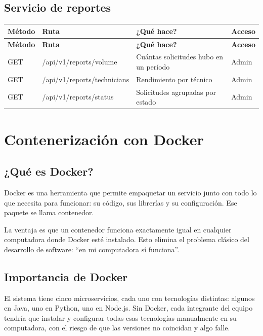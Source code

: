 \documentclass[12pt, a4paper]{report}
\begin{document}
\section{Servicio de reportes}

\begin{longtable}{|p{1.8cm}|p{5.2cm}|p{3.8cm}|p{1.8cm}|}
\hline
\textbf{Método} & \textbf{Ruta} & \textbf{¿Qué hace?} &
\textbf{Acceso} \\
\hline
\endfirsthead
\hline
\textbf{Método} & \textbf{Ruta} & \textbf{¿Qué hace?} &
\textbf{Acceso} \\
\hline
\endhead
GET & /api/v1/reports/volume &
Cuántas solicitudes hubo en un período & Admin \\
\hline
GET & /api/v1/reports/technicians &
Rendimiento por técnico & Admin \\
\hline
GET & /api/v1/reports/status &
Solicitudes agrupadas por estado & Admin \\
\hline
\end{longtable}

\newpage

\chapter{Contenerización con Docker}

\section{¿Qué es Docker?}

Docker es una herramienta que permite empaquetar un servicio junto
con todo lo que necesita para funcionar: su código, sus librerías y
su configuración. Ese paquete se llama contenedor.

La ventaja es que un contenedor funciona exactamente igual en
cualquier computadora donde Docker esté instalado. Esto elimina el
problema clásico del desarrollo de software: ``en mi computadora
sí funciona''.

\section{Importancia de Docker}

El sistema tiene cinco microservicios, cada uno con tecnologías
distintas: algunos en Java, uno en Python, uno en Node.js. Sin Docker,
cada integrante del equipo tendría que instalar y configurar todas
esas tecnologías manualmente en su computadora, con el riesgo de que
las versiones no coincidan y algo falle.
\end{document}
